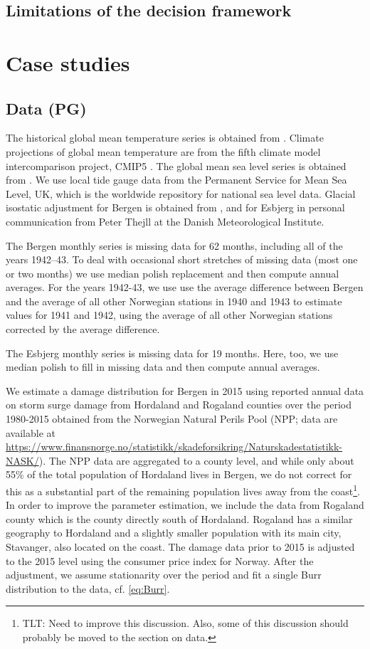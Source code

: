 \documentclass[draft,linenumbers]{agujournal}
\begin{document}
\subsection{Limitations of the decision framework}

\section{Case studies}

\subsection{Data {\color{blue} (PG)}}
The historical global mean temperature series is obtained from \citet{giss}. Climate projections of global mean temperature are from the fifth climate model intercomparison project, CMIP5 \citep{cmip5}. The global mean sea level series is obtained from \citet{csiro}. We use local tide gauge data from the Permanent Service for Mean Sea Level, UK, which is the worldwide repository for national sea level data. Glacial isostatic adjustment for Bergen is obtained from \citet{Simpson2014}, and for Esbjerg in personal communication from Peter Thejll at the Danish Meteorological Institute. 

The Bergen monthly series is missing data for 62 months, including all of the years 1942--43. To deal with occasional short stretches of missing data (most one or two months) we use median polish replacement \citep{medpol} and then compute annual averages. For the years 1942-43, we use use the average difference between Bergen and the average of all other Norwegian stations in 1940 and 1943 to estimate values for 1941 and 1942, using the average of all other Norwegian stations corrected by the average difference. 

The Esbjerg monthly series is missing data for 19 months. Here, too, we use median polish to fill in missing data and then compute annual averages.

We estimate a damage distribution for Bergen in 2015 using reported annual data on storm surge damage from Hordaland and Rogaland counties over the period 1980-2015 obtained from the Norwegian Natural Perils Pool (NPP;  data are available at \url{https://www.finansnorge.no/statistikk/skadeforsikring/Naturskadestatistikk-NASK/}). The NPP data are aggregated to a county level, and while only about 55\% of the total population of Hordaland lives in Bergen, we do not correct for this as a substantial part of the remaining population lives away from the coast\footnote{TLT: Need to improve this discussion. Also, some of this discussion should probably be moved to the section on data.}. In order to improve the parameter estimation, we include the data from Rogaland county which is the county directly south of Hordaland. Rogaland has a similar geography to Hordaland and a slightly smaller population with its main city, Stavanger, also located on the coast. The damage data prior to 2015 is adjusted to the 2015 level using the consumer price index for Norway. After the adjustment, we assume stationarity over the period and fit a single Burr distribution to the data, cf. \eqref{eq:Burr}.  
\end{document}
